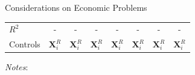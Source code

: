 \documentclass{beamer}
\begin{document}
\begin{frame}{Considerations on Economic Problems}
\begin{table}[!htbp]
{\begin{threeparttable}
\begin{tabular}{l||ccc||cc||cc}
$R^2$                               &-    &-    &-    &-    &-    &-    &-  \\
Controls                 &  $\mathbf{X}_{i}^{R}$  &  $\mathbf{X}_{i}^{R}$&  $\mathbf{X}_{i}^{R}$&  $\mathbf{X}_{i}^{R}$&  $\mathbf{X}_{i}^{R}$&  $\mathbf{X}_{i}^{R}$&  $\mathbf{X}_{i}^{R}$     \\
\bottomrule
\end{tabular}
\begin{tablenotes}[flushleft]
\item \textit{Notes}:   
\end{tablenotes}
\end{threeparttable}
}
\end{table}
\hfill \hyperlink{posttreatment}{} \hyperlink{equations1}{}
\end{frame}
\end{document}
